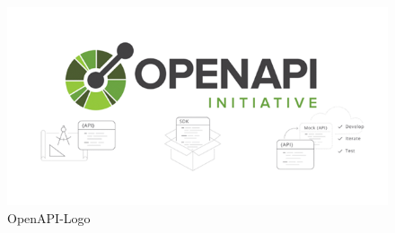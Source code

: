 \begin{figure}[H]
    \centering
    \includegraphics{media/REST/OpenAPILogo.png}
    \caption{OpenAPI-Logo \cite{RestSoap}}
\end{figure}